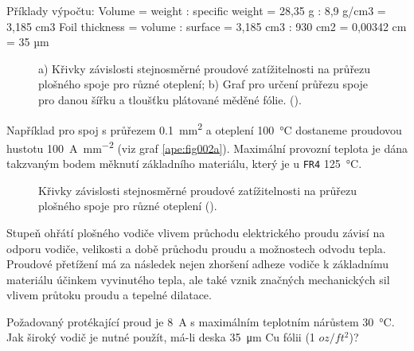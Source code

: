       Příklady výpočtu:
      Volume = weight : specific weight = 28,35 g : 8,9 g/cm3 = 3,185 cm3
      Foil thickness = volume : surface = 3,185 cm3 : 930 cm2 = 0,00342 cm = 35 µm


    \begin{figure}[ht!] %
      \centering
        \newline
      \caption{a) Křivky závislosti stejnosměrné proudové zatížitelnosti na průřezu plošného spoje 
               pro různé oteplení; b) Graf pro určení průřezu spoje pro danou šířku a tloušťku 
               plátované měděné fólie.
               (\cite[s.~9]{IPC2152}).}
      \label{ape:fig002}
    \end{figure}
    
    Například pro spoj s průřezem \SI{0.1}{\mm\squared} a oteplení \SI{100}{\degreeCelsius} 
    dostaneme proudovou hustotu \SI{100}{\A\per\mm\squared} (viz graf \ref{ape:fig002a}). Maximální 
    provozní teplota je dána takzvaným bodem měknutí základního materiálu, který je u \texttt{FR4} 
    \SI{125}{\degreeCelsius}. 
    
   
    \begin{figure}[ht!] %
      \centering
                                  \newline
      \subcaptionbox{Závislost pro průřez vodiče od \SI{0.01}{\mm\squared} do \SI{0.1}{\mm\squared}]
        \label{ape:fig003b}}{\luafigure[1]{ape_fig003b.png}}
      \caption{Křivky závislosti stejnosměrné proudové zatížitelnosti na průřezu plošného spoje 
                pro různé oteplení (\cite[s.~10]{IPC2152}).}
      \label{ape:fig003}
    \end{figure}

    Stupeň ohřátí plošného vodiče vlivem průchodu elektrického proudu závisí na odporu vodiče,
    velikosti a době průchodu proudu a možnostech odvodu tepla. Proudové přetížení má za
    následek nejen zhoršení adheze vodiče k základnímu materiálu účinkem vyvinutého tepla, ale
    také vznik značných mechanických sil vlivem průtoku proudu a tepelné dilatace. 
    
    \begin{example}
      Požadovaný protékající proud je \SI{8}{\A} s maximálním teplotním nárůstem 
      \SI{30}{\degreeCelsius}. Jak široký vodič je nutné použít, má-li deska \SI{35}{\micro\m} Cu 
      fólii (\num{1} \(oz/ft^2\))? 
      
    \end{example}
    
